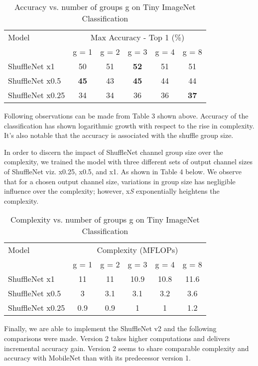 \documentclass{article}
\begin{document}
\begin{table}[H]
  \caption{Accuracy vs. number of groups g on Tiny ImageNet Classification}
  \label{sample-table}
  \centering
  \begin{tabular}{lccccc}
    \toprule
    Model     & \multicolumn{5}{c}{Max Accuracy - Top 1 (\%)}   \\
     & g = 1 & g = 2 & g = 3 & g = 4 & g = 8 \\
    \midrule
    ShuffleNet x1 & 50 & 51 & \textbf{52} & 51 & 51   \\
    ShuffleNet x0.5 & \textbf{45} & 43 & \textbf{45} & 44 & 44     \\
    ShuffleNet x0.25 & 34 & 34 & 36 & 36 & \textbf{37}  \\
    \bottomrule
  \end{tabular}
\end{table}

Following observations can be made from Table 3 shown above. Accuracy of the classification has shown logarithmic growth with respect to the rise in complexity. It's also notable that the accuracy is associated with the shuffle group size.

In order to discern the impact of ShuffleNet channel group size over the complexity, we trained the model with three different sets of output channel sizes of ShuffleNet viz. x0.25, x0.5, and x1. As shown in Table 4 below. We observe that for a chosen output channel size, variations in group size has negligible influence over the complexity; however, x\textit{S} exponentially heightens the complexity.

\begin{table}[H]
  \caption{Complexity vs. number of groups g on Tiny ImageNet Classification}
  \label{sample-table}
  \centering
  \begin{tabular}{lccccc}
    \toprule
    Model     & \multicolumn{5}{c}{Complexity (MFLOPs)}   \\
     & g = 1 & g = 2 & g = 3 & g = 4 & g = 8 \\
    \midrule
    ShuffleNet x1 & 11 & 11 & 10.9 & 10.8 & 11.6   \\
    ShuffleNet x0.5 & 3 & 3.1 & 3.1 & 3.2 & 3.6     \\
    ShuffleNet x0.25 & 0.9 & 0.9 & 1 & 1 & 1.2  \\
    \bottomrule
  \end{tabular}
\end{table}

Finally, we are able to implement the ShuffleNet v2 and the following comparisons were made. Version 2 takes higher computations and delivers incremental accuracy gain. Version 2 seems to share comparable complexity and accuracy with MobileNet than with its predecessor version 1.
\end{document}
